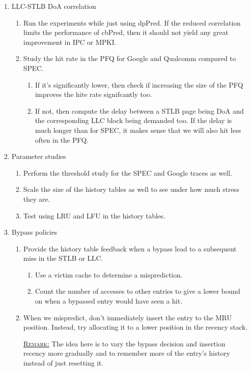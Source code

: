 \documentclass[12pt]{article}
\begin{document}
\begin{enumerate}
  \item LLC-STLB DoA correlation 
  \begin{enumerate}
    \item Run the experiments while just using dpPred. If the reduced correlation limits the
      performance of cbPred, then it should not yield any great improvement in IPC or MPKI.
    \item Study the hit rate in the PFQ for Google and Qualcomm compared to SPEC.
      \begin{enumerate}
        \item If it's significantly lower, then check if increasing the size of the PFQ improves
          the hite rate signifcantly too.
        \item If not, then compute the delay between a STLB page being DoA and the corresponding
          LLC block being demanded too. If the delay is much longer than for SPEC, it makes sense
          that we will also hit less often in the PFQ.
      \end{enumerate}
  \end{enumerate}
  \item Parameter studies 
  \begin{enumerate}
    \item Perform the threshold study for the SPEC and Google traces as well.
    \item Scale the size of the history tables as well to see under how much stress they are.
    \item Test using LRU and LFU in the history tables.
  \end{enumerate}
  \item Bypass policies
    \begin{enumerate}
      \item Provide the history table feedback when a bypass lead to a subsequent miss in the STLB or LLC.
        \begin{enumerate}
          \item Use a victim cache to determine a misprediction.
          \item Count the number of accesses to other entries to give a lower bound on when
            a bypassed entry would have seen a hit.
        \end{enumerate}
      \item When we mispredict, don't immediately insert the entry to the MRU position. Instead,
        try allocating it to a lower position in the recency stack.

        \underline{\textsc{Remark:}} The idea here is to vary the bypass decision and insertion recency
        more gradually and to remember more of the entry's history instead of just resetting it.
    \end{enumerate}
\end{enumerate}
\end{document}
